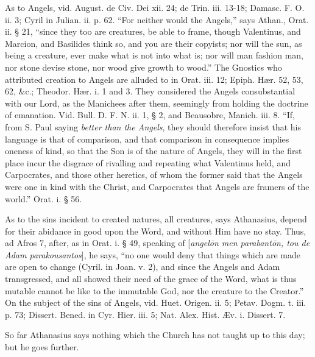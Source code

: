 As to Angels, vid. August. de Civ. Dei xii. 24;
de Trin. iii. 13-18; Damasc. F. O. ii. 3; Cyril in Julian. ii. p. 62. ``For
neither would the Angels,'' says Athan., Orat. ii. § 21, ``since they
too are creatures, be able to frame, though Valentinus, and Marcion,
and Basilides think so, and you are their copyists; nor will the sun,
as being a creature, ever make what is not into what is; nor will man
fashion man, nor stone devise stone, nor wood give growth to wood.''
The Gnostics who attributed creation to Angels are alluded to in Orat.
iii. 12; Epiph. Hær. 52, 53, 62, \&c.; Theodor. Hær. i. 1 and 3.
They considered the Angels consubstantial with our Lord, as the
Manichees after them, seemingly from holding the doctrine of
emanation. Vid. Bull. D. F. N. ii. 1, § 2, and Beausobre, Manich.
iii. 8. ``If, from S. Paul saying \emph{better than the Angels}, they
should therefore insist that his language is that of comparison, and
that comparison in consequence implies oneness of kind, so that the
Son is of the nature of Angels, they will in the first place incur the
disgrace of rivalling and repeating what Valentinus held, and
Carpocrates, and those other heretics, of whom the former said that
the Angels were one in kind with the Christ, and Carpocrates that
Angels are framers of the world.'' Orat. i. § 56.

As to the sins incident to created natures, all
creatures, says Athanasius, depend for their abidance in good upon the
Word, and without Him have no stay. Thus, ad Afros 7, after, as in
Orat. i. § 49, speaking of [\emph{angel\={o}n men parabant\={o}n,
tou de Adam parakousantos}], he says, ``no one would deny that
things which are made are open to change (Cyril. in Joan. v. 2), and
since the Angels and Adam transgressed, and all showed their need of
the grace of the Word, what is thus mutable cannot be like to the
immutable God, nor the creature to the Creator.'' On the subject of the
sins of Angels, vid. Huet. Origen. ii. 5; Petav. Dogm. t. iii. p. 73;
Dissert. Bened. in Cyr. Hier. iii. 5; Nat. Alex. Hist. Æv. i.
Dissert. 7.

So far Athanasius says nothing which the Church
has not taught up to this day; but he goes further.


